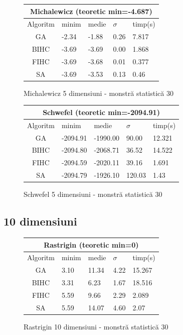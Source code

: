 \documentclass{article}
\begin{document}
\begin{figure}[!h]
\begin{tabular}{||c|||l|l|l|l||}
  \hline
  \multicolumn{5}{||c||}{Michalewicz (teoretic min=-4.687)} \\ \hline
  Algoritm & minim & medie & $\sigma$ & timp(s) \\ \hline \hline
  GA & -2.34 & -1.88 & 0.26 & 7.817 \\ \hline
  BIHC & -3.69 & -3.69 & 0.00 & 1.868\\ \hline
  FIHC & -3.69 & -3.68 & 0.01 & 0.377 \\ \hline
  SA & -3.69 & -3.53 & 0.13 & 0.46 \\ \hline
\end{tabular}
\caption{Michalewicz 5 dimensiuni - monstră statistică 30} 
\end{figure}

\begin{figure}[!h]
\begin{tabular}{||c|||l|l|l|l||}
  \hline
  \multicolumn{5}{||c||}{Schwefel (teoretic min=-2094.91)} \\ \hline
  Algoritm & minim & medie & $\sigma$ & timp(s) \\ \hline \hline
  GA & -2094.91 & -1990.00 & 90.00 & 12.321\\ \hline
  BIHC & -2094.80 & -2068.71 & 36.52 & 14.522\\ \hline
  FIHC & -2094.59 & -2020.11 & 39.16 & 1.691 \\ \hline
  SA & -2094.79 & -1926.10 & 120.03 & 1.43 \\ \hline
\end{tabular}
\caption{Schwefel 5 dimensiuni - monstră statistică 30} 
\end{figure}

\clearpage
\subsection{10 dimensiuni}


\begin{figure}[!h]
\begin{tabular}{||c|||l|l|l|l||}
  \hline
  \multicolumn{5}{||c||}{Rastrigin (teoretic min=0)} \\ \hline
  Algoritm & minim & medie & $\sigma$ & timp(s) \\ \hline \hline
  GA & 3.10 & 11.34 & 4.22 & 15.267 \\ \hline
  BIHC & 3.31 & 6.23 & 1.67 & 18.516\\ \hline
  FIHC & 5.59 & 9.66 & 2.29 & 2.089 \\ \hline
  SA & 5.59 & 14.07 & 4.60 & 2.07 \\ \hline
\end{tabular}
\caption{Rastrigin 10 dimensiuni - monstră statistică 30} 
\end{figure}
\end{document}

